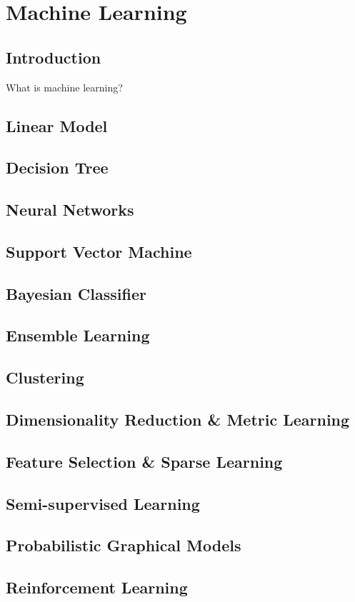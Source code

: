 
\chapter{Machine Learning}



\section{Introduction}
What is machine learning?



\section{Linear Model}
\section{Decision Tree}
\section{Neural Networks}
\section{Support Vector Machine}
\section{Bayesian Classifier}
\section{Ensemble Learning}
\section{Clustering}
\section{Dimensionality Reduction \& Metric Learning}
\section{Feature Selection \& Sparse Learning}
\section{Semi-supervised Learning}
\section{Probabilistic Graphical Models}
\section{Reinforcement Learning}